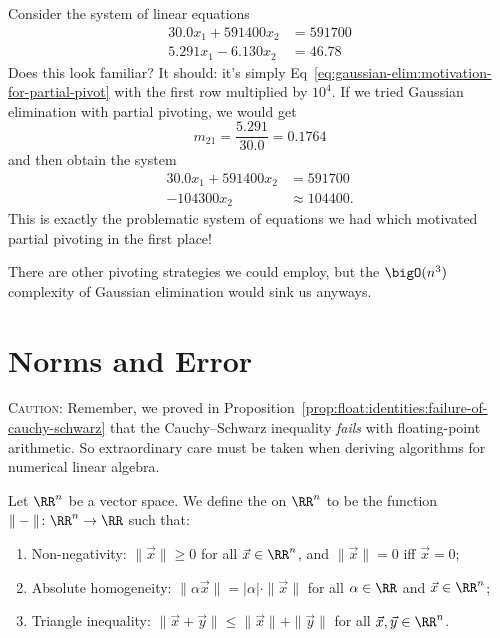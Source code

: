 \begin{example}
Consider the system of linear equations
\begin{subequations}
\begin{align}
30.0x_{1} + 591400 x_{2} &= 591700\\
5.291x_{1} - 6.130 x_{2} &= 46.78
\end{align}
\end{subequations}
Does this look familiar? It should: it's simply Eq~\eqref{eq:gaussian-elim:motivation-for-partial-pivot}
with the first row multiplied by $10^{4}$. If we tried Gaussian
elimination with partial pivoting, we would get
\begin{equation*}
m_{21}=\frac{5.291}{30.0}=0.1764
\end{equation*}
and then obtain the system
\begin{subequations}
\begin{align}
30.0x_{1} + 591400 x_{2} &= 591700\\
-104300 x_{2} &\approx 104400.
\end{align}
\end{subequations}
This is exactly the problematic system of equations we had which
motivated partial pivoting in the first place!
\end{example}

There are other pivoting strategies we could employ, but the
$\bigO(n^{3})$ complexity of Gaussian elimination would sink us
anyways.

\section{Norms and Error}

\textsc{Caution:} Remember, we proved in Proposition~\ref{prop:float:identities:failure-of-cauchy-schwarz}
that the Cauchy--Schwarz inequality \emph{fails} with floating-point
arithmetic. So extraordinary care must be taken when deriving algorithms
for numerical linear algebra.

\begin{definition}
Let $\RR^{n}$ be a vector space. We define the  on
$\RR^{n}$ to be the function $\|-\|\colon\RR^{n}\to\RR$ such that:
\begin{enumerate}
\item Non-negativity: $\|\vec{x}\|\geq0$ for all $\vec{x}\in\RR^{n}$, and
  $\|\vec{x}\|=0$ iff $\vec{x}=0$;
\item Absolute homogeneity: $\|\alpha\vec{x}\|=|\alpha|\cdot\|\vec{x}\|$
  for all $\alpha\in\RR$ and $\vec{x}\in\RR^{n}$;
\item Triangle inequality: $\|\vec{x}+\vec{y}\|\leq\|\vec{x}\|+\|\vec{y}\|$
  for all $\vec{x},\vec{y}\in\RR^{n}$.
\end{enumerate}
\end{definition}

